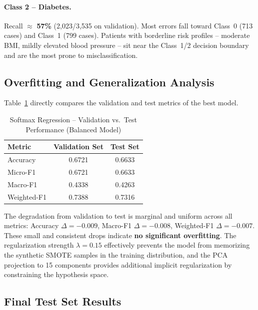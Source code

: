 \documentclass[12pt,a4paper]{article}
\begin{document}
\paragraph{Class 2 -- Diabetes.}
Recall $\approx$ \textbf{57\%} (2,023/3,535 on validation). Most errors fall toward Class~0 (713 cases) and Class~1 (799 cases). Patients with borderline risk profiles -- moderate BMI, mildly elevated blood pressure -- sit near the Class~1/2 decision boundary and are the most prone to misclassification.

\subsection{Overfitting and Generalization Analysis}

Table~\ref{tab:softmax_val_vs_test} directly compares the validation and test metrics of the best model.

\begin{table}[H]
    \centering
    \caption{Softmax Regression -- Validation vs.\ Test Performance (Balanced Model)}
    \label{tab:softmax_val_vs_test}
    \begin{tabular}{lcc}
        \toprule
        \textbf{Metric} & \textbf{Validation Set} & \textbf{Test Set} \\
        \midrule
        Accuracy    & 0.6721 & 0.6633 \\
        Micro-F1    & 0.6721 & 0.6633 \\
        Macro-F1    & 0.4338 & 0.4263 \\
        Weighted-F1 & 0.7388 & 0.7316 \\
        \bottomrule
    \end{tabular}
\end{table}

The degradation from validation to test is marginal and uniform across all metrics: Accuracy $\Delta = -0.009$, Macro-F1 $\Delta = -0.008$, Weighted-F1 $\Delta = -0.007$. These small and consistent drops indicate \textbf{no significant overfitting}. The regularization strength $\lambda = 0.15$ effectively prevents the model from memorizing the synthetic SMOTE samples in the training distribution, and the PCA projection to 15 components provides additional implicit regularization by constraining the hypothesis space.

\subsection{Final Test Set Results}
\label{sec:softmax_final}
\end{document}
